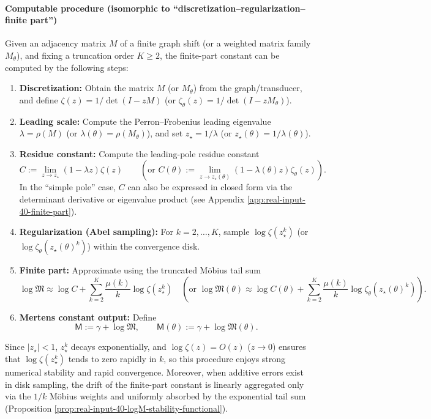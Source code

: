 \paragraph{Computable procedure (isomorphic to ``discretization--regularization--finite part'')}
Given an adjacency matrix $M$ of a finite graph shift (or a weighted matrix family $M_\theta$), and fixing a truncation order $K\ge 2$, the finite-part constant can be computed by the following steps:
\begin{enumerate}
  \item \textbf{Discretization:} Obtain the matrix $M$ (or $M_\theta$) from the graph/transducer, and define $\zeta(z)=1/\det(I-zM)$ (or $\zeta_\theta(z)=1/\det(I-zM_\theta)$).
  \item \textbf{Leading scale:} Compute the Perron--Frobenius leading eigenvalue $\lambda=\rho(M)$ (or $\lambda(\theta)=\rho(M_\theta)$), and set $z_\star=1/\lambda$ (or $z_\star(\theta)=1/\lambda(\theta)$).
  \item \textbf{Residue constant:} Compute the leading-pole residue constant
  \[
  C:=\lim_{z\to z_\star}(1-\lambda z)\zeta(z)
  \qquad
  (\text{or }C(\theta):=\lim_{z\to z_\star(\theta)}(1-\lambda(\theta)z)\zeta_\theta(z)).
  \]
  In the ``simple pole'' case, $C$ can also be expressed in closed form via the determinant derivative or eigenvalue product (see Appendix \ref{app:real-input-40-finite-part}).
  \item \textbf{Regularization (Abel sampling):} For $k=2,\dots,K$, sample $\log\zeta(z_\star^k)$ (or $\log\zeta_\theta(z_\star(\theta)^k)$) within the convergence disk.
  \item \textbf{Finite part:} Approximate using the truncated M\"{o}bius tail sum
  \[
  \log\mathfrak{M}\approx \log C+\sum_{k=2}^{K}\frac{\mu(k)}{k}\log\zeta(z_\star^k)
  \quad
  (\text{or }\log\mathfrak{M}(\theta)\approx \log C(\theta)+\sum_{k=2}^{K}\frac{\mu(k)}{k}\log\zeta_\theta(z_\star(\theta)^k)).
  \]
  \item \textbf{Mertens constant output:} Define
  \[
  \mathsf{M}:=\gamma+\log\mathfrak{M},
  \qquad
  \mathsf{M}(\theta):=\gamma+\log\mathfrak{M}(\theta).
  \]
\end{enumerate}
Since $|z_\star|<1$, $z_\star^k$ decays exponentially, and $\log\zeta(z)=O(z)$ ($z\to 0$) ensures that $\log\zeta(z_\star^k)$ tends to zero rapidly in $k$, so this procedure enjoys strong numerical stability and rapid convergence.
Moreover, when additive errors exist in disk sampling, the drift of the finite-part constant is linearly aggregated only via the \(1/k\) M\"obius weights and uniformly absorbed by the exponential tail sum (Proposition \ref{prop:real-input-40-logM-stability-functional}).

